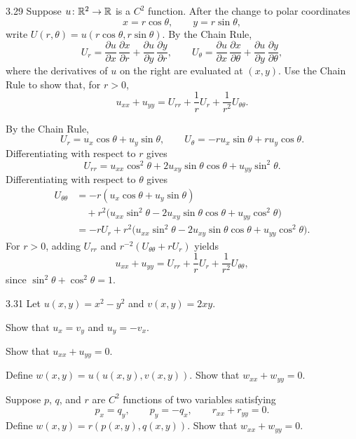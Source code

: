 \documentclass[11pt,oneside]{article}
\begin{document}
\begin{problem}{3.29}
Suppose $u\colon\mathbb{R}^2\to\mathbb{R}$ is a $C^2$ function. After the change to polar coordinates
\[
    x=r\cos\theta,
    \qquad
    y=r\sin\theta,
\]
write $U(r,\theta)=u(r\cos\theta,r\sin\theta)$. By the Chain Rule,
\[
    U_r=\frac{\partial u}{\partial x}\,\frac{\partial x}{\partial r}+\frac{\partial u}{\partial y}\,\frac{\partial y}{\partial r},
    \qquad
    U_\theta=\frac{\partial u}{\partial x}\,\frac{\partial x}{\partial\theta}+\frac{\partial u}{\partial y}\,\frac{\partial y}{\partial\theta},
\]
where the derivatives of $u$ on the right are evaluated at $(x,y)$. Use the Chain Rule to show that, for $r>0$,
\[
    u_{xx}+u_{yy}=U_{rr}+\frac1r U_r+\frac1{r^2}U_{\theta\theta}.
\]
\end{problem}

\begin{solution}
By the Chain Rule,
\[
    U_r=u_x\cos\theta+u_y\sin\theta,
    \qquad
    U_\theta=-ru_x\sin\theta+ru_y\cos\theta.
\]
Differentiating with respect to $r$ gives
\[
    U_{rr}
    =u_{xx}\cos^2\theta+2u_{xy}\sin\theta\cos\theta+u_{yy}\sin^2\theta.
\]
Differentiating with respect to $\theta$ gives
\begin{align*}
    U_{\theta\theta}
    &=-r(u_x\cos\theta+u_y\sin\theta)\\
    &\quad+r^2\bigl(u_{xx}\sin^2\theta-2u_{xy}\sin\theta\cos\theta+u_{yy}\cos^2\theta\bigr)\\
    &=-rU_r+r^2\bigl(u_{xx}\sin^2\theta-2u_{xy}\sin\theta\cos\theta+u_{yy}\cos^2\theta\bigr).
\end{align*}
For $r>0$, adding $U_{rr}$ and $r^{-2}(U_{\theta\theta}+rU_r)$ yields
\[
    \boxed{u_{xx}+u_{yy}=U_{rr}+\frac1r U_r+\frac1{r^2}U_{\theta\theta}},
\]
since $\sin^2\theta+\cos^2\theta=1$.
\end{solution}

\begin{problem}{3.31}
Let $u(x,y)=x^2-y^2$ and $v(x,y)=2xy$.
\begin{problemsubparts}
    \item Show that $u_x=v_y$ and $u_y=-v_x$.
    \item Show that $u_{xx}+u_{yy}=0$.
    \item Define $w(x,y)=u(u(x,y),v(x,y))$. Show that $w_{xx}+w_{yy}=0$.
    \item Suppose $p$, $q$, and $r$ are $C^2$ functions of two variables satisfying
    \[
        p_x=q_y,\qquad p_y=-q_x,\qquad r_{xx}+r_{yy}=0.
    \]
    Define $w(x,y)=r(p(x,y),q(x,y))$. Show that $w_{xx}+w_{yy}=0$.
\end{problemsubparts}
\end{problem}
\end{document}
